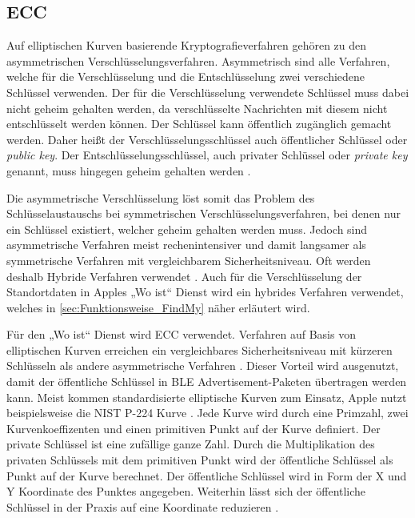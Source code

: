 \subsection{\acf{ECC}}
\label{sec:ecc}
Auf elliptischen Kurven basierende Kryptografieverfahren gehören zu den asymmetrischen Verschlüsselungsverfahren.
Asymmetrisch sind alle Verfahren, welche für die Verschlüsselung und die Entschlüsselung zwei verschiedene Schlüssel verwenden.
Der für die Verschlüsselung verwendete Schlüssel muss dabei nicht geheim gehalten werden, da verschlüsselte Nachrichten mit diesem nicht entschlüsselt werden können.
Der Schlüssel kann öffentlich zugänglich gemacht werden.
Daher heißt der Verschlüsselungsschlüssel auch öffentlicher Schlüssel oder \textit{public key}.
Der Entschlüsselungsschlüssel, auch privater Schlüssel oder \textit{private key} genannt, muss hingegen geheim gehalten werden \cite[S. 173ff.]{Krypto}.

Die asymmetrische Verschlüsselung löst somit das Problem des Schlüsselaustauschs bei symmetrischen Verschlüsselungsverfahren, bei denen nur ein Schlüssel existiert, welcher geheim gehalten werden muss.
Jedoch sind asymmetrische Verfahren meist rechenintensiver und damit langsamer als symmetrische Verfahren mit vergleichbarem Sicherheitsniveau.
Oft werden deshalb Hybride Verfahren verwendet \cite[S. 178f.]{Krypto}.
Auch für die Verschlüsselung der Standortdaten in Apples „Wo ist“ Dienst wird ein hybrides Verfahren verwendet, welches in \autoref{sec:Funktionsweise_FindMy} näher erläutert wird.

Für den „Wo ist“ Dienst wird \ac{ECC} verwendet.
Verfahren auf Basis von elliptischen Kurven erreichen ein vergleichbares Sicherheitsniveau mit kürzeren Schlüsseln als andere asymmetrische Verfahren \cite[S. 273.]{Krypto}.
Dieser Vorteil wird ausgenutzt, damit der öffentliche Schlüssel in \ac{BLE} Advertisement-Paketen übertragen werden kann.
Meist kommen standardisierte elliptische Kurven zum Einsatz, Apple nutzt beispielsweise die NIST P-224 Kurve \cite{Heinrich_FindMy}.
Jede Kurve wird durch eine Primzahl, zwei Kurvenkoeffizenten und einen primitiven Punkt auf der Kurve definiert.
Der private Schlüssel ist eine zufällige ganze Zahl.
Durch die Multiplikation des privaten Schlüssels mit dem primitiven Punkt wird der öffentliche Schlüssel als Punkt auf der Kurve berechnet.
Der öffentliche Schlüssel wird in Form der X und Y Koordinate des Punktes angegeben.
Weiterhin lässt sich der öffentliche Schlüssel in der Praxis auf eine Koordinate reduzieren \cite[S. 284f.]{Krypto}.

